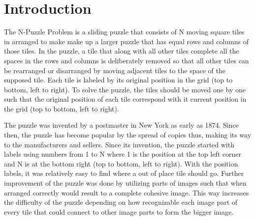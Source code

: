 \section{Introduction}

\par The N-Puzzle Problem is a sliding puzzle that consists of N moving square tiles in arranged to make make up a larger puzzle that has equal rows and columns of those tiles. In the puzzle, a tile that along with all other tiles complete all the spaces in the rows and columns is deliberately removed so that all other tiles can be rearranged or disarranged by moving adjacent tiles to the space of the supposed tile. Each tile is labeled by its original position in the grid (top to bottom, left to right). To solve the puzzle, the tiles should be moved one by one such that the original position of each tile correspond with it current position in the grid (top to bottom, left to right).\cite{bnb}

\par The puzzle was invented by a postmaster in New York as early as 1874. Since then, the puzzle has become popular by the spread of copies thus, making its way to the manufacturers and sellers. Since its invention, the puzzle started with labels using numbers from 1 to N where 1 is the position at the top left corner and N is at the bottom right (top to bottom, left to right). With the position labels, it was relatively easy to find where a out of place tile should go. Further improvement of the puzzle was done by utilizing parts of images such that when arranged correctly would result to a complete cohesive image. This way increases the difficulty of the puzzle depending on how recognizable each image part of every tile that could connect to other image parts to form the bigger image.\cite{hist}
